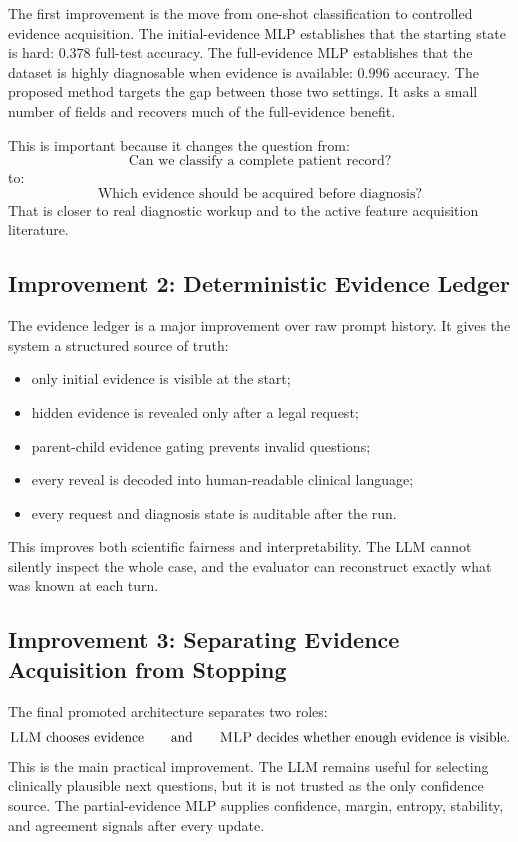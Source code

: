 \documentclass[11pt]{article}
\newcommand{\mlp}{\textsc{MLP}}
\newcommand{\llm}{\textsc{LLM}}
\begin{document}
The first improvement is the move from one-shot classification to controlled evidence acquisition. The initial-evidence MLP establishes that the starting state is hard: $0.378$ full-test accuracy. The full-evidence MLP establishes that the dataset is highly diagnosable when evidence is available: $0.996$ accuracy. The proposed method targets the gap between those two settings. It asks a small number of fields and recovers much of the full-evidence benefit.

This is important because it changes the question from:
\[
\text{Can we classify a complete patient record?}
\]
to:
\[
\text{Which evidence should be acquired before diagnosis?}
\]
That is closer to real diagnostic workup and to the active feature acquisition literature.

\subsection{Improvement 2: Deterministic Evidence Ledger}

The evidence ledger is a major improvement over raw prompt history. It gives the system a structured source of truth:
\begin{itemize}[leftmargin=*]
    \item only initial evidence is visible at the start;
    \item hidden evidence is revealed only after a legal request;
    \item parent-child evidence gating prevents invalid questions;
    \item every reveal is decoded into human-readable clinical language;
    \item every request and diagnosis state is auditable after the run.
\end{itemize}

This improves both scientific fairness and interpretability. The \llm{} cannot silently inspect the whole case, and the evaluator can reconstruct exactly what was known at each turn.

\subsection{Improvement 3: Separating Evidence Acquisition from Stopping}

The final promoted architecture separates two roles:
\[
\text{\llm{} chooses evidence} \qquad \text{and} \qquad \text{\mlp{} decides whether enough evidence is visible.}
\]
This is the main practical improvement. The \llm{} remains useful for selecting clinically plausible next questions, but it is not trusted as the only confidence source. The partial-evidence \mlp{} supplies confidence, margin, entropy, stability, and agreement signals after every update.
\end{document}
